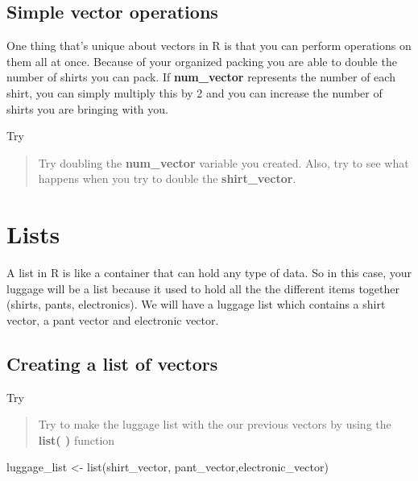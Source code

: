\documentclass[
]{book}
\newenvironment{Shaded}{\begin{snugshade}}{\end{snugshade}}
\newcommand{\FunctionTok}[1]{\textcolor[rgb]{0.00,0.00,0.00}{#1}}
\newcommand{\NormalTok}[1]{#1}
\newcommand{\OtherTok}[1]{\textcolor[rgb]{0.56,0.35,0.01}{#1}}
\begin{document}
\hypertarget{simple-vector-operations}{%
\subsection{Simple vector operations}\label{simple-vector-operations}}

One thing that's unique about vectors in R is that you can perform operations on them all at once. Because of your organized packing you are able to double the number of shirts you can pack. If \textbf{num\_vector} represents the number of each shirt, you can simply multiply this by 2 and you can increase the number of shirts you are bringing with you.

Try

\begin{quote}
Try doubling the \textbf{num\_vector} variable you created. Also, try to see what happens when you try to double the \textbf{shirt\_vector}.
\end{quote}

\hypertarget{lists}{%
\section{Lists}\label{lists}}

A list in R is like a container that can hold any type of data. So in this case, your luggage will be a list because it used to hold all the the different items together (shirts, pants, electronics). We will have a luggage list which contains a shirt vector, a pant vector and electronic vector.

\hypertarget{creating-a-list-of-vectors}{%
\subsection{Creating a list of vectors}\label{creating-a-list-of-vectors}}

Try

\begin{quote}
Try to make the luggage list with the our previous vectors by using the \textbf{list( )} function
\end{quote}

\begin{Shaded}
\begin{Highlighting}[]
\NormalTok{luggage\_list }\OtherTok{\textless{}{-}} \FunctionTok{list}\NormalTok{(shirt\_vector, pant\_vector,electronic\_vector)}
\end{Highlighting}
\end{Shaded}
\end{document}
